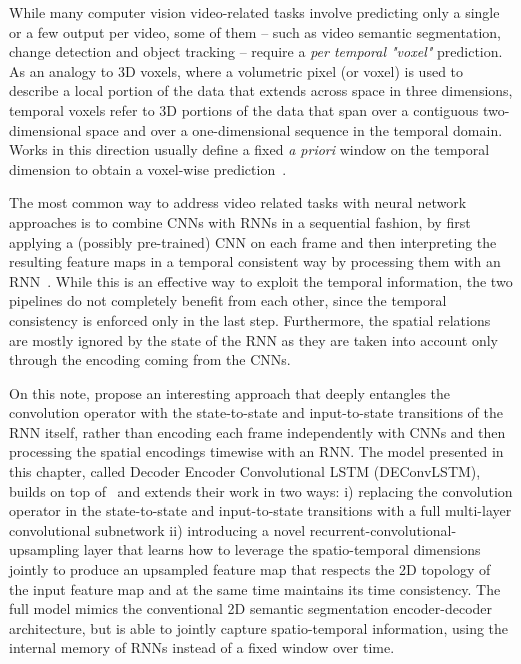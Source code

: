 While many computer vision video-related tasks involve predicting only a single
or a few output per video, some of them -- such as video semantic
segmentation, change detection and object tracking -- require a
\emph{per temporal "voxel"} prediction. As an analogy to 3D voxels, where a
volumetric pixel (or voxel) is used to describe a local portion of the data
that extends across space in three dimensions, temporal voxels refer to 3D
portions of the data that span over a contiguous two-dimensional space and over
a one-dimensional sequence in the temporal domain.
Works in this direction usually define a fixed \emph{a priori} window on the
temporal dimension to obtain a voxel-wise prediction~\citep{Tran16v2v}.

The most common way to address video related tasks with neural network
approaches is to combine CNNs with RNNs in a sequential fashion, by first
applying a (possibly pre-trained) CNN on each frame and then interpreting the
resulting feature maps in a temporal consistent way by processing them with an
RNN~\citep{Donahue-et-al-arxiv2014,Vinyals-et-al-CVPR2015,Karpathy+Li-CVPR2015,
Venugopalan_2015_ICCV}. While this is an effective way to exploit the temporal
information, the two pipelines do not completely benefit from each other, since
the temporal consistency is enforced only in the last step. Furthermore, the
spatial relations are mostly ignored by the state of the RNN as they are taken
into account only through the encoding coming from the CNNs.

On this note, \cite{ShiCWYWW15} propose an interesting approach that deeply
entangles the convolution operator with the state-to-state and input-to-state
transitions of the RNN itself, rather than encoding each frame independently
with CNNs and then processing the spatial encodings timewise with an RNN. The
model presented in this chapter, called Decoder Encoder Convolutional LSTM
(DEConvLSTM), builds on top of~\cite{ShiCWYWW15} and extends their work in two
ways: i) replacing the convolution operator in the state-to-state and
input-to-state transitions with a full multi-layer convolutional subnetwork ii)
introducing a novel recurrent-convolutional-upsampling layer that learns how to
leverage the spatio-temporal dimensions jointly to produce an upsampled feature
map that respects the 2D topology of the input feature map and at the same time
maintains its time consistency. The full model mimics the conventional 2D
semantic segmentation encoder-decoder architecture, but is able to jointly
capture spatio-temporal information, using the internal memory of RNNs instead
of a fixed window over time.

